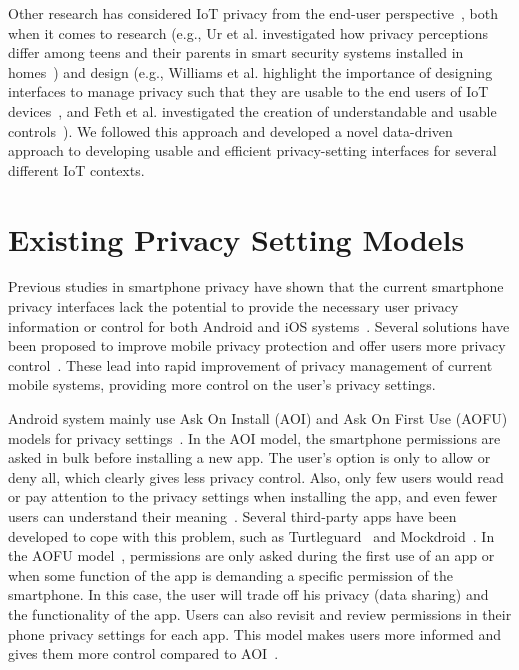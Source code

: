 Other research has considered IoT privacy from the end-user perspective~\cite{feth_user-centered_2017}, both when it comes to research (e.g., Ur et al. investigated how privacy perceptions differ among teens and their parents in smart security systems installed in homes~\cite{ur_intruders_2014}) and design (e.g., Williams et al. highlight the importance of designing interfaces to manage privacy such that they are usable to the end users of IoT devices~\cite{williams2016perfect}, and Feth et al. investigated the creation of understandable and usable controls~\cite{feth_user-centered_2017}). We followed this approach and developed a novel data-driven approach to developing usable and efficient privacy-setting interfaces for several different IoT contexts.

\section{Existing Privacy Setting Models}
Previous studies in smartphone privacy have shown that the current smartphone privacy interfaces lack the potential to provide the necessary user privacy information or control for both Android and iOS systems~\cite{lin2014modeling}. Several solutions have been proposed to improve mobile privacy protection and offer users more privacy control~\cite{felt2012android, beresford2011mockdroid}. These lead into rapid improvement of privacy management of current mobile systems, providing more control on the user's privacy settings.

Android system mainly use Ask On Install (AOI) and Ask On First Use (AOFU) models for privacy settings~\cite{tsai2017turtle, wijesekera2017feasibility}. In the AOI model, the smartphone permissions are asked in bulk before installing a new app. The user's option is only to allow or deny all, which clearly gives less privacy control. Also, only few users would read or pay attention to the privacy settings when installing the app, and even fewer users can understand their meaning~\cite{felt2012android,kelley2012conundrum}. Several third-party apps have been developed to cope with this problem, such as Turtleguard~\cite{tsai2017turtle} and Mockdroid~\cite{beresford2011mockdroid}. %
In the AOFU model~\cite{tsai2017turtle}, permissions are only asked during the first use of an app or when some function of the app is demanding a specific permission of the smartphone. In this case, the user will trade off his privacy (data sharing) and the functionality of the app. Users can also revisit and review permissions in their phone privacy settings for each app. This model makes users more informed and gives them more control compared to AOI~\cite{fu2014field}.

